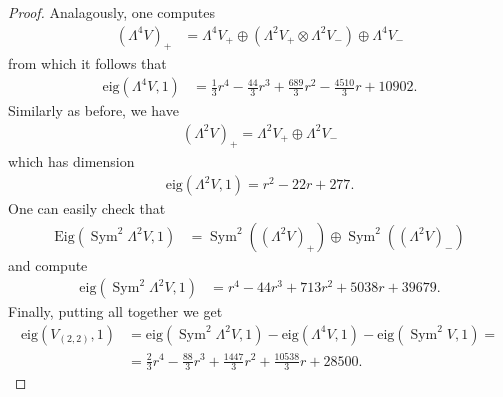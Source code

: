 \documentclass[a4paper,11pt]{amsart}
\newcommand{\eig}{{\mathrm{eig}}}
\newcommand{\Eig}{{\mathrm{Eig}}}
\newcommand{\V}[2]{V_{(#1,#2)}}
\DeclareMathOperator{\Sym}{Sym}
\theoremstyle{plain}
\theoremstyle{remark}
\begin{document}
\begin{proof}
Analagously, one computes
\begin{align*}
    (\Lambda^4 V)_+ &= \Lambda^4 V_+ \oplus (\Lambda^2 V_+ \otimes \Lambda^2 V_-) \oplus \Lambda^4 V_-
    \end{align*}
    from which it follows that 
    \begin{align*}
    \eig(\Lambda^4 V,1) &= 
    \frac{1}{3}r^4 - \frac{44}{3}r^3 + \frac{689}{3}r^2 - \frac{4510}{3}r + 10902.
\end{align*}
Similarly as before, we have 
\begin{align*}
(\Lambda^2V)_+ = \Lambda^2V_+ \oplus \Lambda^2V_-
\end{align*}
which has dimension
\begin{align*}
\eig(\Lambda^2 V,1)=
r^2 - 22r + 277.
\end{align*}
One can easily check that 
\begin{align*} \Eig(\Sym^2\Lambda^2 V,1) &= \Sym^2( (\Lambda^2 V)_+) \oplus\Sym^2( (\Lambda^2 V)_-)
\end{align*}
and compute 
\begin{align*}
\eig(\Sym^2 \Lambda^2 V,1) &=
r^4 - 44r^3 + 713r^2 + 5038r + 39679.
\end{align*}
Finally, putting all together we get
\begin{align*}
\eig(\V22,1) &= \eig(\Sym^2 \Lambda^2 V,1) - \eig(\Lambda^4 V,1) - \eig(\Sym^2 V,1) =\\
&= \frac{2}{3}r^4 - \frac{88}{3}r^3 + \frac{1447}{3}r^2 + \frac{10538}{3}r + 28500.
\end{align*}
\bigskip


\end{proof}
\end{document}
